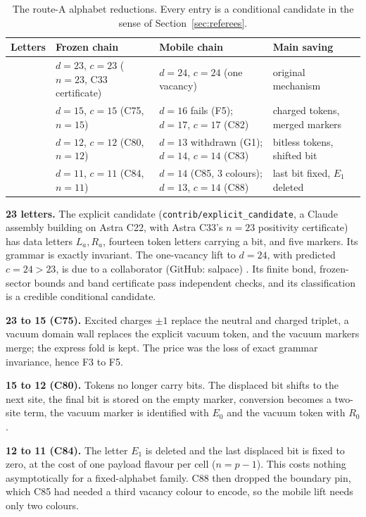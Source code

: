 \documentclass[11pt]{article}
\newcommand{\repo}[1]{\texttt{#1}}
\begin{document}
\begin{table}[h]
\centering
\small
\begin{tabular}{>{\raggedright\arraybackslash}p{}>{\raggedright\arraybackslash}p{}>{\raggedright\arraybackslash}p{}>{\raggedright\arraybackslash}p{}}
\toprule
Letters & Frozen chain & Mobile chain & Main saving\\
\midrule
23 & $d=23$, $c=23$ ($n=23$, C33 certificate) & $d=24$, $c=24$ (one vacancy) & original mechanism\\
15 & $d=15$, $c=15$ (C75, $n=15$) & $d=16$ fails (F5); $d=17$, $c=17$ (C82) & charged tokens, merged markers\\
12 & $d=12$, $c=12$ (C80, $n=12$) & $d=13$ withdrawn (G1); $d=14$, $c=14$ (C83) & bitless tokens, shifted bit\\
11 & $d=11$, $c=11$ (C84, $n=11$) & $d=14$ (C85, 3 colours); $d=13$, $c=14$ (C88) & last bit fixed, $E_1$ deleted\\
\bottomrule
\end{tabular}
\caption{The route-A alphabet reductions. Every entry is a conditional candidate in the sense of Section~\ref{sec:referees}.}\label{tab:history}
\end{table}

\textbf{23 letters.} The explicit candidate (\repo{contrib/explicit\_candidate}, a Claude assembly building on Astra C22, with Astra C33's $n=23$ positivity certificate) has data letters $L_a,R_a$, fourteen token letters carrying a bit, and five markers. Its grammar is exactly invariant. The one-vacancy lift to $d=24$, with predicted $c=24>23$, is due to a collaborator (GitHub: salpace) \cite{d24}. Its finite bond, frozen-sector bounds and band certificate pass independent checks, and its classification is a credible conditional candidate.

\textbf{23 to 15 (C75).} Excited charges $\pm1$ replace the neutral and charged triplet, a vacuum domain wall replaces the explicit vacuum token, and the vacuum markers merge; the express fold is kept. The price was the loss of exact grammar invariance, hence F3 to F5.

\textbf{15 to 12 (C80).} Tokens no longer carry bits. The displaced bit shifts to the next site, the final bit is stored on the empty marker, conversion becomes a two-site term, the vacuum marker is identified with $E_0$ and the vacuum token with $R_0$.

\textbf{12 to 11 (C84).} The letter $E_1$ is deleted and the last displaced bit is fixed to zero, at the cost of one payload flavour per cell ($n=p-1$). This costs nothing asymptotically for a fixed-alphabet family. C88 then dropped the boundary pin, which C85 had needed a third vacancy colour to encode, so the mobile lift needs only two colours.
\end{document}
